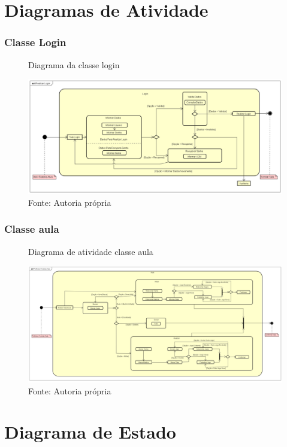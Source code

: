 \documentclass{utfpr-pg}
\begin{document}
\chapter{Diagramas de Atividade}
\subsection{Classe Login}
        \begin{figure}[H]
            \centering
            \captionsetup{width=\textwidth}
            \caption{Diagrama da classe login}
            \includegraphics[width=\linewidth]{fotos/atv1.png}
            \caption*{Fonte: Autoria própria}
            \label{fig:Diagrama de Classes}
        \end{figure}
\subsection{Classe aula}
        \begin{figure}[H]
            \centering
            \captionsetup{width=\textwidth}
            \caption{Diagrama de atividade classe aula}
            \includegraphics[width=\linewidth]{fotos/atv2.png}
            \caption*{Fonte: Autoria própria}
            \label{fig:Diagrama de Classes}
        \end{figure}
\chapter{Diagrama de Estado}
\end{document}
